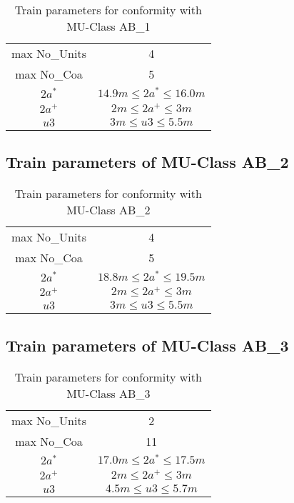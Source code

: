 \begin{appendices}
\begin{table}[h]
    \centering
    \begin{tabular}{c|c}
    \hline
    max No\_Units & 4 \\
    max No\_Coa & 5 \\
    $2a^*$ & $ 14.9 m \leq 2a^* \leq 16.0 m $ \\
    $2a^+$ & $ 2 m \leq 2a^+ \leq 3m $ \\
    $u3$ & $3m \leq u3 \leq 5.5m $ \\
    \hline
    \end{tabular}
    \caption{Train parameters for conformity with MU-Class AB\_1}
    \label{tab:AB1}
\end{table}

\subsection{Train parameters of MU-Class AB\_2}

\begin{table}[h]
    \centering
    \begin{tabular}{c|c}
    \hline
    max No\_Units & 4 \\
    max No\_Coa & 5 \\
    $2a^*$ & $ 18.8 m \leq 2a^* \leq 19.5 m $ \\
    $2a^+$ & $ 2 m \leq 2a^+ \leq 3m $ \\
    $u3$ & $3m \leq u3 \leq 5.5m $ \\
    \hline
    \end{tabular}
    \caption{Train parameters for conformity with MU-Class AB\_2}
    \label{tab:AB2}
\end{table}

\subsection{Train parameters of MU-Class AB\_3}

\begin{table}[h]
    \centering
    \begin{tabular}{c|c}
    \hline
    max No\_Units & 2 \\
    max No\_Coa & 11 \\
    $2a^*$ & $ 17.0 m \leq 2a^* \leq 17.5 m $ \\
    $2a^+$ & $ 2 m \leq 2a^+ \leq 3m $ \\
    $u3$ & $4.5m \leq u3 \leq 5.7m $ \\
    \hline
    \end{tabular}
    \caption{Train parameters for conformity with MU-Class AB\_3}
    \label{tab:AB3}
\end{table}


\end{appendices}
